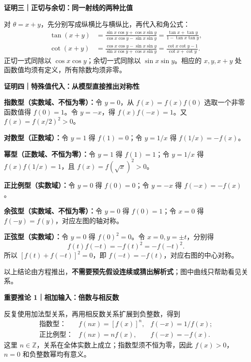 \FReserve{7.5cm}
\begin{proofbox}
\textbf{\textcolor{CProof}{证明三｜正切与余切：同一射线的两种比值}}

对 $\theta=x+y$，先分别写成纵横比与横纵比，再代入和角公式：
\[
\begin{aligned}
\tan(x+y)&=\frac{\sin x\cos y+\cos x\sin y}{\cos x\cos y-\sin x\sin y}
=\frac{\tan x+\tan y}{1-\tan x\tan y},\\[5pt]
\cot(x+y)&=\frac{\cos x\cos y-\sin x\sin y}{\sin x\cos y+\cos x\sin y}
=\frac{\cot x\cot y-1}{\cot x+\cot y}.
\end{aligned}
\]
正切一式同除以 $\cos x\cos y$；余切一式同除以 $\sin x\sin y$。相应的 $x,y,x+y$ 处函数值均须有定义，所有除数均须非零。
\end{proofbox}

\FReserve{7.5cm}
\begin{proofbox}
\textbf{\textcolor{CProof}{证明四｜特殊值代入：从模型直接推出对称性}}

\textbf{指数型（实数域、不恒为零）：}令 $y=0$，从 $f(x)=f(x)f(0)$ 选取一个非零函数值得 $f(0)=1$。令 $y=-x$，得 $f(x)f(-x)=1$。又 $f(x)=f(x/2)^2>0$。

\textbf{对数型（正数域）：}令 $y=1$ 得 $f(1)=0$；令 $y=1/x$ 得 $f(1/x)=-f(x)$。

\textbf{幂型（正数域、不恒为零）：}令 $y=1$ 得 $f(1)=1$；令 $y=1/x$ 得 $f(x)f(1/x)=1$，且 $f(x)=f(\sqrt x)^2>0$。

\textbf{正比例型（实数域）：}令 $y=0$ 得 $f(0)=0$；令 $y=-x$ 得 $f(-x)=-f(x)$。

\textbf{余弦型（实数域、不恒为零）：}令 $y=0$ 得 $f(0)=1$；令 $x=0$ 得 $f(-y)=f(y)$，对应左图的轴对称。

\textbf{正弦型（实数域）：}令 $y=0$ 得 $f(0)^2=0$。令 $x=0,y=\pm t$，分别得
\[f(t)f(-t)=-f(t)^2=-f(-t)^2.\]
所以 $[f(t)+f(-t)]^2=0$，即 $f(-t)=-f(t)$，对应右图的中心对称。

以上结论由方程推出，\textbf{不需要预先假设连续或猜出解析式}；图中曲线只帮助看见关系。
\end{proofbox}

\FReserve{7.5cm}
\begin{proofbox}
\textbf{\textcolor{CProof}{重要推论 1｜相加输入：倍数与相反数}}

反复使用加法型关系，再用相反数关系扩展到负整数，得到
\[
\begin{array}{lll}
\text{指数型：}&f(nx)=[f(x)]^n,&f(-x)=1/f(x);\\[4pt]
\text{正比例型：}&f(nx)=nf(x),&f(-x)=-f(x).
\end{array}
\]
这里 $n\in\mathbb Z$，关系在全体实数上成立；指数型须不恒为零，因此 $f(x)>0$，$n=0$ 和负整数幂均有意义。
\end{proofbox}

